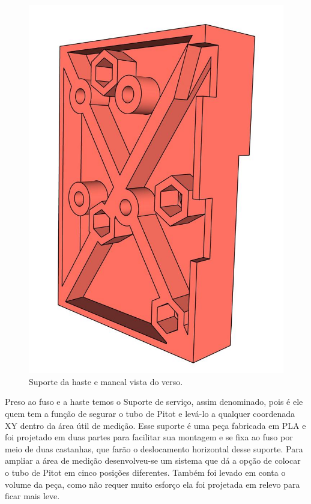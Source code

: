 \begin{figure}[H]
\centering
\caption{Suporte da haste e mancal vista do verso.}\label{fig:ressuportehastemancalfv}
\includegraphics[scale = 0.4]{figuras/ressuportehastemancalfv}
\end{figure}

\pagebreak

Preso ao fuso e a haste temos o Suporte de serviço, assim denominado, pois é ele quem 
tem a função de segurar o tubo de Pitot e levá-lo a qualquer coordenada XY dentro 
da área útil de medição. Esse suporte é uma peça fabricada em \ac{PLA} e foi projetado 
em duas partes para facilitar sua montagem e se fixa ao fuso por meio de duas castanhas, 
que farão o deslocamento horizontal desse suporte. Para ampliar a área de medição 
desenvolveu-se um sistema que dá a opção de colocar o tubo de Pitot em cinco posições diferentes. 
Também foi levado em conta o volume da peça, como não requer muito esforço ela foi projetada 
em relevo para ficar mais leve.

